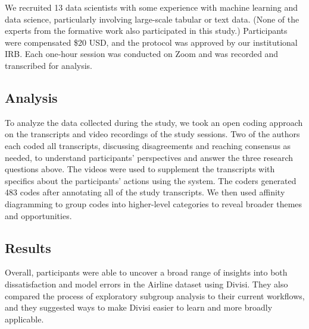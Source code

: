 We recruited 13 data scientists with some experience with machine learning and data science, particularly involving large-scale tabular or text data. 
(None of the experts from the formative work also participated in this study.)
Participants were compensated \$20 USD, and the protocol was approved by our institutional IRB.
Each one-hour session was conducted on Zoom and was recorded and transcribed for analysis.

\subsection{Analysis}
To analyze the data collected during the study, we took an open coding approach on the transcripts and video recordings of the study sessions. Two of the authors each coded all transcripts, discussing disagreements and reaching consensus as needed, to understand participants' perspectives and answer the three research questions above. The videos were used to supplement the transcripts with specifics about the participants' actions using the system. The coders generated 483 codes after annotating all of the study transcripts. We then used affinity diagramming to group codes into higher-level categories to reveal broader themes and opportunities.

\subsection{Results}
Overall, participants were able to uncover a broad range of insights into both dissatisfaction and model errors in the Airline dataset using Divisi.
They also compared the process of exploratory subgroup analysis to their current workflows, and they suggested ways to make Divisi easier to learn and more broadly applicable.

